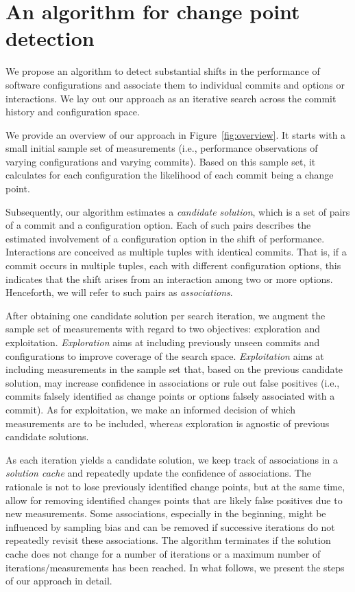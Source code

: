 \documentclass[sigconf, screen]{acmart}
\begin{document}
	\section{An algorithm for change point detection}\label{sec:cpmodel}
	We propose an algorithm to detect substantial shifts in the performance of software configurations and associate them to individual commits and options or interactions. We lay out our approach as an iterative search across the commit history and configuration space. 
	
	We provide an overview of our approach in Figure~\ref{fig:overview}. 
	It starts with a small initial sample set of measurements (i.e., performance observations of varying configurations and varying commits). 
	Based on this sample set, it calculates for each configuration the likelihood of each commit being a change point. 
	
	Subsequently, our algorithm estimates a \emph{candidate solution}, which is a set of pairs of a commit and a configuration option. 
	Each of such pairs describes the estimated involvement of a configuration option in the shift of performance. 
	Interactions are conceived as multiple tuples with identical commits. That is, if a commit occurs in multiple tuples, each with different configuration options, this indicates that the shift arises from an interaction among two or more options. 
	Henceforth, we will refer to such pairs as \emph{associations}.
	
	After obtaining one candidate solution per search iteration, we augment the sample set of measurements with regard to two objectives: exploration and exploitation. 
	\emph{Exploration} aims at including previously unseen commits and configurations to improve coverage of the search space. 
	\emph{Exploitation} aims at including measurements in the sample set that, based on the previous candidate solution, may increase confidence in associations or rule out false positives (i.e., commits falsely identified as change points or options falsely associated with a commit). 
	As for exploitation, we make an informed decision of which measurements are to be included, whereas exploration is agnostic of previous candidate solutions.
	
	As each iteration yields a candidate solution, we keep track of associations in a \emph{solution cache} and repeatedly update the confidence of associations. 
	The rationale is not to lose previously identified change points, but at the same time, allow for removing identified changes points that are likely false positives due to new measurements.
	Some associations, especially in the beginning, might be influenced by sampling bias and can be removed if successive iterations do not repeatedly revisit these associations. 
	The algorithm terminates if the solution cache does not change for a number of iterations or a maximum number of iterations/measurements has been reached.
	In what follows, we present the steps of our approach in detail. 
	
\end{document}
